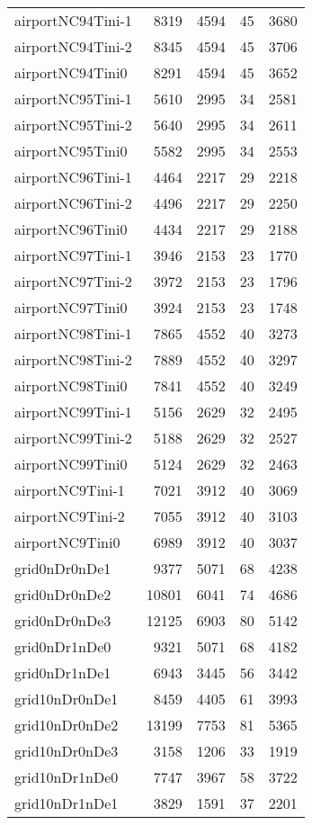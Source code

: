 \documentclass[../../../thesis.tex]{subfiles}
\begin{document}
\begin{longtable}{lrrrr}
airportNC94Tini-1 & 8319 & 4594 & 45 & 3680 \\
airportNC94Tini-2 & 8345 & 4594 & 45 & 3706 \\
airportNC94Tini0 & 8291 & 4594 & 45 & 3652 \\
airportNC95Tini-1 & 5610 & 2995 & 34 & 2581 \\
airportNC95Tini-2 & 5640 & 2995 & 34 & 2611 \\
airportNC95Tini0 & 5582 & 2995 & 34 & 2553 \\
airportNC96Tini-1 & 4464 & 2217 & 29 & 2218 \\
airportNC96Tini-2 & 4496 & 2217 & 29 & 2250 \\
airportNC96Tini0 & 4434 & 2217 & 29 & 2188 \\
airportNC97Tini-1 & 3946 & 2153 & 23 & 1770 \\
airportNC97Tini-2 & 3972 & 2153 & 23 & 1796 \\
airportNC97Tini0 & 3924 & 2153 & 23 & 1748 \\
airportNC98Tini-1 & 7865 & 4552 & 40 & 3273 \\
airportNC98Tini-2 & 7889 & 4552 & 40 & 3297 \\
airportNC98Tini0 & 7841 & 4552 & 40 & 3249 \\
airportNC99Tini-1 & 5156 & 2629 & 32 & 2495 \\
airportNC99Tini-2 & 5188 & 2629 & 32 & 2527 \\
airportNC99Tini0 & 5124 & 2629 & 32 & 2463 \\
airportNC9Tini-1 & 7021 & 3912 & 40 & 3069 \\
airportNC9Tini-2 & 7055 & 3912 & 40 & 3103 \\
airportNC9Tini0 & 6989 & 3912 & 40 & 3037 \\
grid0nDr0nDe1 & 9377 & 5071 & 68 & 4238 \\
grid0nDr0nDe2 & 10801 & 6041 & 74 & 4686 \\
grid0nDr0nDe3 & 12125 & 6903 & 80 & 5142 \\
grid0nDr1nDe0 & 9321 & 5071 & 68 & 4182 \\
grid0nDr1nDe1 & 6943 & 3445 & 56 & 3442 \\
grid10nDr0nDe1 & 8459 & 4405 & 61 & 3993 \\
grid10nDr0nDe2 & 13199 & 7753 & 81 & 5365 \\
grid10nDr0nDe3 & 3158 & 1206 & 33 & 1919 \\
grid10nDr1nDe0 & 7747 & 3967 & 58 & 3722 \\
grid10nDr1nDe1 & 3829 & 1591 & 37 & 2201 \\

\end{longtable}
\end{document}
